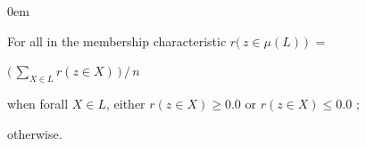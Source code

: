 \documentclass[a4paper,12pt,english]{sphinxhowto}
\begin{document}
\begin{DUlineblock}{0em}
\item[] For all  in  the membership characteristic \(r\big(\,z \in \mu(L)\,\big)\; =\)
\item[]
\begin{DUlineblock}{\DUlineblockindent}
\item[] \(\big( \, \sum_{X \in L} r(z \in X) \, \big)\,/\, n\)
\item[]
\begin{DUlineblock}{\DUlineblockindent}
\item[] when forall \(X \in L\), either \(r(z \in X) \geqslant 0.0\) or \(r(z \in X) \leqslant 0.0\) ;
\end{DUlineblock}
\item[]  otherwise.
\end{DUlineblock}
\end{DUlineblock}
\end{document}
